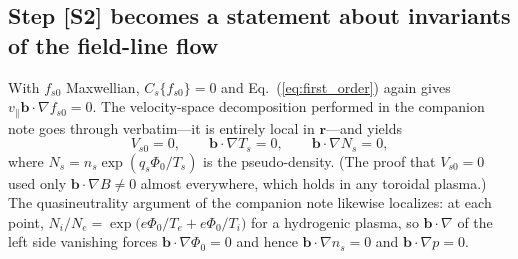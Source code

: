 \documentclass[english]{article}
\newcommand{\bb}{\mathbf{b}}
\newcommand{\br}{\mathbf{r}}
\begin{document}
\subsection{Step [S2] becomes a statement about invariants of the field-line flow}
\label{sec:invariants}

With $f_{s0}$ Maxwellian, $C_s\{f_{s0}\}=0$ and Eq.~(\ref{eq:first_order}) again gives
$v_\parallel\bb\cdot\nabla f_{s0}=0$. The velocity-space decomposition performed in the companion
note goes through verbatim---it is entirely local in $\br$---and yields
\begin{equation}
V_{s0}=0,\qquad \bb\cdot\nabla T_s=0,\qquad \bb\cdot\nabla N_s=0 ,
\label{eq:parallel_constraints}
\end{equation}
where $N_s=n_s\exp(q_s\Phi_0/T_s)$ is the pseudo-density. (The proof that $V_{s0}=0$ used only
$\bb\cdot\nabla B\ne0$ almost everywhere, which holds in any toroidal plasma.) The quasineutrality
argument of the companion note likewise localizes: at each point,
$N_i/N_e=\exp\big(e\Phi_0/T_e+e\Phi_0/T_i\big)$ for a hydrogenic plasma, so $\bb\cdot\nabla$ of the
left side vanishing forces $\bb\cdot\nabla\Phi_0=0$ and hence $\bb\cdot\nabla n_s=0$ and
$\bb\cdot\nabla p=0$.
\end{document}
